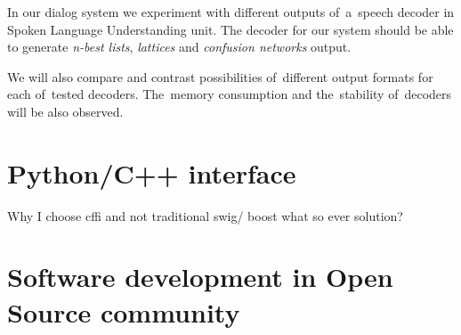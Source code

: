 In our dialog system we experiment with different outputs of~a~speech decoder in Spoken Language Understanding unit. 
The decoder for our system should be able to generate {\it n-best lists}, {\it lattices} and {\it confusion networks} output.




% 
% 

We will also compare and contrast possibilities of~different output formats for each of~tested decoders. The~memory consumption and the~stability of~decoders will be also observed. 




\section{Python/C++ interface} 
\label{sec:python_c_interface}
Why I choose cffi and not traditional swig/ boost what so ever solution?



\section{Software development in Open Source community} 
\label{sec:software_development_in_open_source_community}

